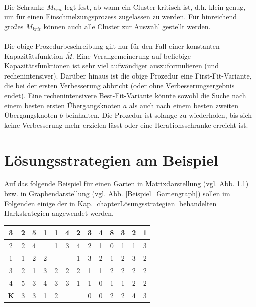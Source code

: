 \phantom \\
\noindent Die Schranke $M_{krit}$ legt fest, ab wann ein Cluster \glqq kritisch\grqq{} ist, d.h. \glqq klein genug\grqq{}, um für einen \glqq Einschmelzungsprozess\grqq{} zugelassen zu werden. Für hinreichend großes $M_{krit}$ können auch alle Cluster zur Auswahl gestellt werden. \\
\\
Die obige Prozedurbeschreibung gilt nur für den Fall einer konstanten Kapazitätsfunktion $\overline{M}$. Eine Verallgemeinerung auf beliebige Kapazitätsfunktionen ist sehr viel aufwändiger auszuformulieren (und rechenintensiver). Darüber hinaus ist die obige Prozedur eine First-Fit-Variante, die bei der ersten Verbesserung abbricht (oder ohne Verbesserungsergebnis endet). Eine rechenintensivere Best-Fit-Variante könnte sowohl die Suche nach einem \glqq besten ersten\grqq{} Übergangsknoten $a$ als auch nach einem \glqq besten zweiten\grqq{} Übergangsknoten $b$ beinhalten. Die Prozedur ist solange zu wiederholen, bis sich keine Verbesserung mehr erzielen lässt oder eine Iterationsschranke erreicht ist.









\chapter{Lösungsstrategien am Beispiel}\label{Anhang_Beispiele}

Auf das folgende Beispiel für einen Garten in Matrixdarstellung (vgl. Abb. \ref{Beispiel_Gartenmatrix}) bzw. in Graphendarstellung (vgl. Abb. \ref{Beispiel_Gartengraph}) sollen im Folgenden einige der in Kap. \ref{chapterLösungsstrategien} behandelten Harkstrategien angewendet werden.

\begin{center}
\begin{minipage}{\textwidth}
\renewcommand{\arraystretch}{1.5}
\begin{table}[H]
\centering 
\begin{scriptsize}
\begin{tabular}{|>{}c|>{}c|>{}c|>{}c|>{}c|>{}c|>{}c|>{}c|>{}c|>{}c|>{}c|>{}c|>{}c|}
\hline
3&2&5&1&1&4&2&3&4&8&3&2&1 \\
\hline
2&2&4&\cellcolor{gray!50!white} &1&3&4&2&1&0&1&1&3 \\
\hline
1&1&2&2&\cellcolor{gray!50!white} &\cellcolor{gray!50!white} &1&3&2&1&2&3&2 \\
\hline
3&2&1&3&2&2&2&1&1&2&2&2&2 \\
\hline
4&5&3&4&3&3&1&1&0&1&1&2&2 \\
\hline
\cellcolor{gray!50!white}\bf{K}&3&3&1&2&\cellcolor{gray!50!white} &\cellcolor{gray!50!white} &0&0&2&2&4&3 \\
\hline
\end{tabular}
\label{Beispiel_Gartenmatrix}
\end{scriptsize} 
\end{table}
\renewcommand{\arraystretch}{1}
\end{minipage}
\end{center}

